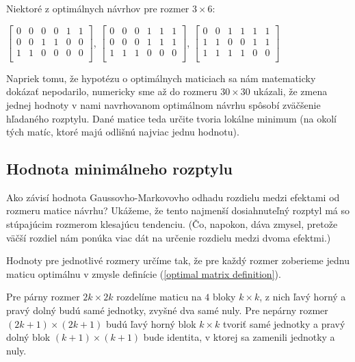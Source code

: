 Niektoré z optimálnych návrhov pre rozmer $3 \times 6$:

\begin{center}
$
\begin{bmatrix}
0 & 0 & 0 & 0 & 1 & 1 \\
0 & 0 & 1 & 1 & 0 & 0 \\
1 & 1 & 0 & 0 & 0 & 0 \\
\end{bmatrix}
$,
$
\begin{bmatrix}
0 & 0 & 0 & 1 & 1 & 1 \\
0 & 0 & 0 & 1 & 1 & 1 \\
1 & 1 & 1 & 0 & 0 & 0 \\
\end{bmatrix}
$,
$
\begin{bmatrix}
0 & 0 & 1 & 1 & 1 & 1 \\
1 & 1 & 0 & 0 & 1 & 1 \\
1 & 1 & 1 & 1 & 0 & 0 \\
\end{bmatrix}
$
\end{center}

Napriek tomu, že hypotézu o optimálnych maticiach sa nám matematicky dokázať nepodarilo, numericky sme až do rozmeru $30 \times 30$ ukázali,
že zmena jednej hodnoty v nami navrhovanom optimálnom návrhu spôsobí zväčšenie hľadaného rozptylu.
Dané matice teda určite tvoria lokálne minimum (na okolí tých matíc, ktoré majú odlišnú najviac jednu hodnotu).

\subsection{Hodnota minimálneho rozptylu}

Ako závisí hodnota Gaussovho-Markovovho odhadu rozdielu medzi efektami od rozmeru matice návrhu? 
Ukážeme, že tento najmenší dosiahnuteľný rozptyl má so stúpajúcim rozmerom klesajúcu tendenciu. 
(Čo, napokon, dáva zmysel, pretože väčší rozdiel nám ponúka viac dát na určenie rozdielu medzi dvoma efektmi.)

Hodnoty pre jednotlivé rozmery určíme tak, že pre každý rozmer zoberieme jednu maticu optimálnu 
v zmysle definície (\ref{optimal matrix definition}).

Pre párny rozmer $2k \times 2k$ rozdelíme maticu na $4$ bloky $k \times k$, 
z nich ľavý horný a pravý dolný budú samé jednotky, zvyšné dva samé nuly. 
Pre nepárny rozmer $(2k + 1) \times (2k + 1)$ budú ľavý horný blok $k \times k$ tvoriť samé jednotky 
a pravý dolný blok $(k + 1) \times (k + 1)$ bude identita, v ktorej sa zamenili jednotky a nuly.

